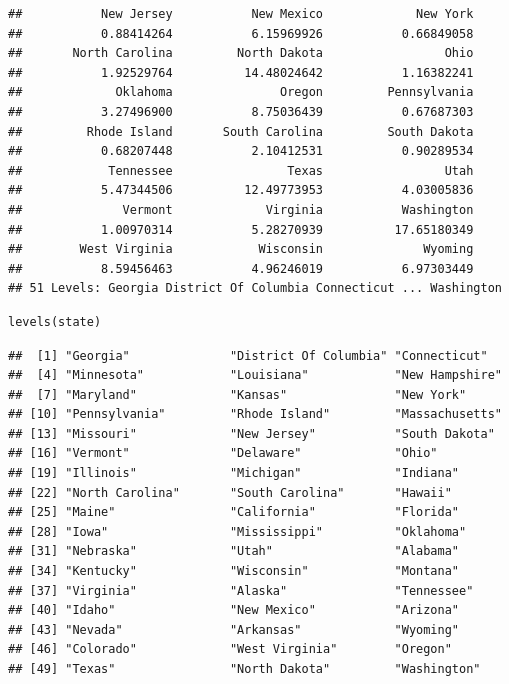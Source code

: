 \documentclass[
]{article}
\begin{document}
\begin{verbatim}
##           New Jersey           New Mexico             New York 
##           0.88414264           6.15969926           0.66849058 
##       North Carolina         North Dakota                 Ohio 
##           1.92529764          14.48024642           1.16382241 
##             Oklahoma               Oregon         Pennsylvania 
##           3.27496900           8.75036439           0.67687303 
##         Rhode Island       South Carolina         South Dakota 
##           0.68207448           2.10412531           0.90289534 
##            Tennessee                Texas                 Utah 
##           5.47344506          12.49773953           4.03005836 
##              Vermont             Virginia           Washington 
##           1.00970314           5.28270939          17.65180349 
##        West Virginia            Wisconsin              Wyoming 
##           8.59456463           4.96246019           6.97303449 
## 51 Levels: Georgia District Of Columbia Connecticut ... Washington
\end{verbatim}

\begin{verbatim}
levels(state)
\end{verbatim}

\begin{verbatim}
##  [1] "Georgia"              "District Of Columbia" "Connecticut"         
##  [4] "Minnesota"            "Louisiana"            "New Hampshire"       
##  [7] "Maryland"             "Kansas"               "New York"            
## [10] "Pennsylvania"         "Rhode Island"         "Massachusetts"       
## [13] "Missouri"             "New Jersey"           "South Dakota"        
## [16] "Vermont"              "Delaware"             "Ohio"                
## [19] "Illinois"             "Michigan"             "Indiana"             
## [22] "North Carolina"       "South Carolina"       "Hawaii"              
## [25] "Maine"                "California"           "Florida"             
## [28] "Iowa"                 "Mississippi"          "Oklahoma"            
## [31] "Nebraska"             "Utah"                 "Alabama"             
## [34] "Kentucky"             "Wisconsin"            "Montana"             
## [37] "Virginia"             "Alaska"               "Tennessee"           
## [40] "Idaho"                "New Mexico"           "Arizona"             
## [43] "Nevada"               "Arkansas"             "Wyoming"             
## [46] "Colorado"             "West Virginia"        "Oregon"              
## [49] "Texas"                "North Dakota"         "Washington"
\end{verbatim}
\end{document}
